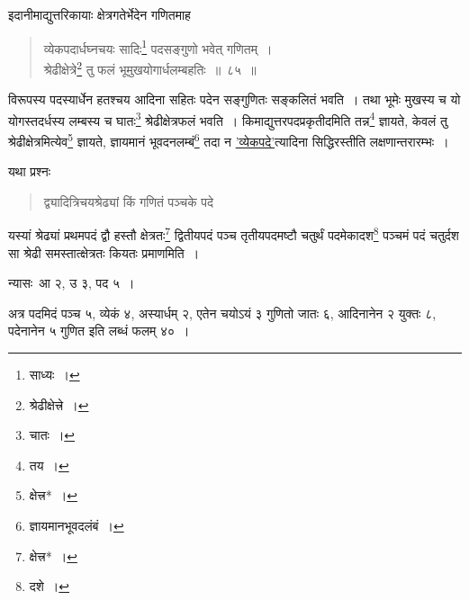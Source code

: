 \documentclass[10pt, openany]{book}
\begin{document}
{\newpage

{इदानीमाद्युत्तरिकायाः क्षेत्रगतेर्भेदेन गणितमाह\textemdash} 

 \label{85}
\begin{quote}
{\bs व्येकपदार्धघ्नचयः सादिः\renewcommand{\thefootnote}{\s १}\footnote{\s साध्यः~।} पदसङ्गुणो भवेत् गणितम्~। \\
 श्रेढीक्षेत्रे\renewcommand{\thefootnote}{\s २}\footnote{\s श्रेढीक्षेत्त्रे~।} तु फलं भूमुखयोगार्धलम्बहतिः~॥~८५~॥}
 \end{quote}

 {विरूपस्य पदस्यार्धेन हतश्चय आदिना सहितः पदेन सङ्गुणितः सङ्कलितं भवति~।}
{तथा भूमेः मुखस्य च यो योगस्तदर्धस्य लम्बस्य च घातः\renewcommand{\thefootnote}{\s ३}\footnote{\s चातः~।}
श्रेढीक्षेत्रफलं भवति~। किमाद्युत्तरपदप्रकृतीदमिति तन्न\renewcommand{\thefootnote}{\s ४}\footnote{\s तय~।} ज्ञायते, केवलं तु श्रेढीक्षेत्रमित्येव\renewcommand{\thefootnote}{\s ५}\footnote{\s *क्षेत्त्र*~।}
ज्ञायते, ज्ञायमानं भूवदनलम्बं\renewcommand{\thefootnote}{\s ६}\footnote{\s ज्ञायमानभूवदलंबं~।} तदा न}
{\hyperref[85]{'व्येकपदे'}त्यादिना सिद्धिरस्तीति लक्षणान्तरारम्भः~।}
\vspace{3mm}

{यथा प्रश्नः\textemdash}

\begin{quote}
{\eg द्व्यादित्रिचयश्रेढ्यां किं गणितं पञ्चके पदे} 
\end{quote}

{यस्यां श्रेढ्यां प्रथमपदं द्वौ हस्तौ क्षेत्रतः\renewcommand{\thefootnote}{\s ७}\footnote{\s क्षेत्त्र*~।} द्वितीयपदं पञ्च
तृतीयपदमष्टौ चतुर्थं}
{पदमेकादश\renewcommand{\thefootnote}{\s ८}\footnote{\s *दशे~।} पञ्चमं पदं चतुर्दश सा श्रेढी समस्तात्क्षेत्रतः कियतः
प्रमाणमिति~।}
\vspace{3mm}

{न्यासः\textendash \,\hspace{4mm} आ २, उ ३, पद ५~।}
\vspace{3mm}

{अत्र पदमिदं पञ्च ५, व्येकं ४, अस्यार्धम् २, एतेन चयोऽयं ३ गुणितो जातः}
{६, आदिनानेन २ युक्तः ८, पदेनानेन ५ गुणित इति लब्धं फलम् ४०~।}
\vspace{3mm}

}
\end{document}
